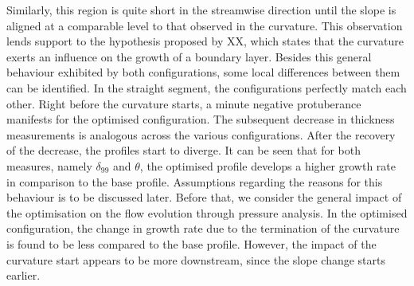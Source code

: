 Similarly, this region is quite short in the streamwise direction until the slope is aligned at a comparable level to that observed  in the curvature.
This observation lends support to the hypothesis proposed by XX, which states that the curvature exerts an influence on the growth of a boundary layer.
Besides this general behaviour exhibited by both configurations, some local differences between them can be identified.
In the straight segment, the configurations perfectly match each other. 
Right before the curvature starts, a minute negative protuberance manifests  for the optimised configuration.
The subsequent decrease in thickness measurements is analogous across the various configurations.
After the recovery of the decrease, the profiles start to diverge.
It can be seen that for both measures, namely $\delta_{99}$ and $\theta$, the optimised profile develops a higher growth rate in comparison to the base profile.
Assumptions regarding the reasons for this behaviour is to be discussed later. Before that, we consider the general impact  of the optimisation on the flow evolution  through pressure analysis.
In the optimised configuration, the change in  growth rate due to the termination of the curvature is found to be less compared to the base profile.
However, the impact of the curvature start appears to be more downstream, since the slope change starts earlier.

